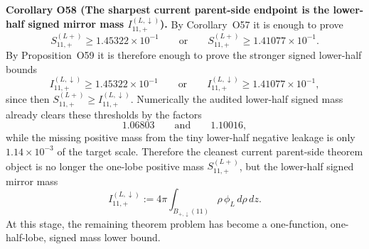 \documentclass[aps,prd,onecolumn,notitlepage,nofootinbib,superscriptaddress,11pt,floatfix]{revtex4-2}
\begin{document}
\medskip\noindent\textbf{Corollary O58 (The sharpest current parent-side endpoint is the lower-half signed mirror mass \(I_{11,+}^{(L,\downarrow)}\)).}
By Corollary~O57 it is enough to prove
\[
S_{11,+}^{(L+)}\ge 1.45322\times10^{-1}
\qquad\text{or}\qquad
S_{11,+}^{(L+)}\ge 1.41077\times10^{-1}.
\]
By Proposition~O59 it is therefore enough to prove the stronger signed lower-half bounds
\[
I_{11,+}^{(L,\downarrow)}\ge 1.45322\times10^{-1}
\qquad\text{or}\qquad
I_{11,+}^{(L,\downarrow)}\ge 1.41077\times10^{-1},
\]
since then \(S_{11,+}^{(L+)}\ge I_{11,+}^{(L,\downarrow)}\).  Numerically the audited lower-half signed mass already clears these thresholds by the factors
\[
1.06803
\qquad\text{and}\qquad
1.10016,
\]
while the missing positive mass from the tiny lower-half negative leakage is only \(1.14\times10^{-3}\) of the target scale.  Therefore the cleanest current parent-side theorem object is no longer the one-lobe positive mass \(S_{11,+}^{(L+)}\), but the lower-half signed mirror mass
\[
I_{11,+}^{(L,\downarrow)}
:=
4\pi \int_{B_{+,\downarrow}(11)} \rho\,\phi_L\,d\rho\,dz.
\]
At this stage, the remaining theorem problem has become a one-function, one-half-lobe, signed mass lower bound.
\end{document}
